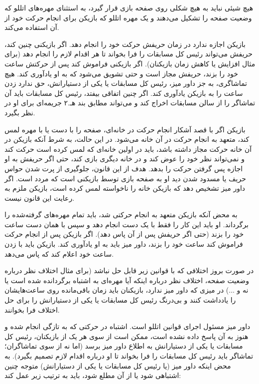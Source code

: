 هیچ شیئی نباید به هیچ شکلی روی صفحه بازی قرار گیرد، به استثنای مهره‌های اتللو که وضعیت صفحه را تشکیل می‌دهند و یک مهره اتللو که بازیکن برای انجام حرکت خود از آن استفاده می‌کند.


بازیکن اجازه ندارد در زمان حریفش حرکت خود را انجام دهد. اگر بازیکنی چنین کند، حریفش می‌تواند رئیس کل مسابقات را فرا بخواند تا هر اقدام لازم را انجام دهد (برای مثال افزایش یا کاهش زمان بازیکنان). اگر بازیکنی فراموش کند پس از حرکتش ساعت خود را بزند، حریفش مجاز است و حتی تشویق می‌شود که به او یادآوری کند. هیچ تماشاگری، به جز داور میز، رئیس کل مسابقات یا یکی از دستیارانش، حق ندارد زدن ساعت را به بازیکن یادآوری کند. اگر چنین اتفاقی بیفتد، رئیس کل مسابقات باید آن تماشاگر را از سالن مسابقات اخراج کند و می‌تواند مطابق بند هـ.۲ جریمه‌ای برای او در نظر بگیرد.

بازیکن اگر با قصد آشکار انجام حرکت در خانه‌ای، صفحه را با دست یا با مهره لمس کند، متعهد به انجام حرکت در آن خانه می‌شود. در این حالت، به شرط آنکه بازیکن در آن خانه حرکت مجاز داشته باشد، باید در اولین خانه‌ای که لمس کرده است حرکت کند و نمی‌تواند نظر خود را عوض کند و در خانه دیگری بازی کند، حتی اگر حریفش به او اجازه پس گرفتن حرکت را بدهد. هدف از این قانون، جلوگیری از پرت شدن حواس حریف یا مسدود شدن دید او به صفحه بازی توسط بازیکنی است که مردد است. اگر داور میز تشخیص دهد که بازیکن خانه را ناخواسته لمس کرده است، بازیکن ملزم به رعایت این قانون نیست.

به محض آنکه بازیکن متعهد به انجام حرکتی شد، باید تمام مهره‌های گرفته‌شده را برگرداند. او باید این کار را فقط با یک دست انجام دهد و سپس با همان دست ساعت خود را بزند (حتی اگر حریفش پس از آن پاس دهد). اگر بازیکن پس از انجام حرکت فراموش کند ساعت خود را بزند، داور میز باید به او یادآوری کند. بازیکن باید با زدن ساعت خود اعلام کند که پاس می‌دهد.



در صورت بروز اختلافی که با قوانین زیر قابل حل نباشد (برای مثال اختلاف نظر درباره وضعیت صفحه، اختلاف نظر درباره اینکه آیا مهره‌ای به اشتباه برگردانده شده است یا نه و ...) در میزی که داور میز ندارد، بازیکنان باید زمان باقی‌مانده روی ساعت‌هایشان را یادداشت کنند و بی‌درنگ رئیس کل مسابقات یا یکی از دستیارانش را برای حل اختلاف فرا بخوانند.

داور میز مسئول اجرای قوانین اتللو است. اشتباه در حرکتی که به تازگی انجام شده و هنوز به آن پاسخ داده نشده است، ممکن است از سوی هر یک از بازیکنان، رئیس کل مسابقات یا یکی از دستیارانش به اطلاع داور میز برسد (اما نه از سوی تماشاگران؛ تماشاگر باید رئیس کل مسابقات را فرا بخواند تا او درباره اقدام لازم تصمیم بگیرد). به محض اینکه داور میز (یا رئیس کل مسابقات یا یکی از دستیارانش) متوجه چنین اشتباهی شود یا از آن مطلع شود، باید به ترتیب زیر عمل کند:

